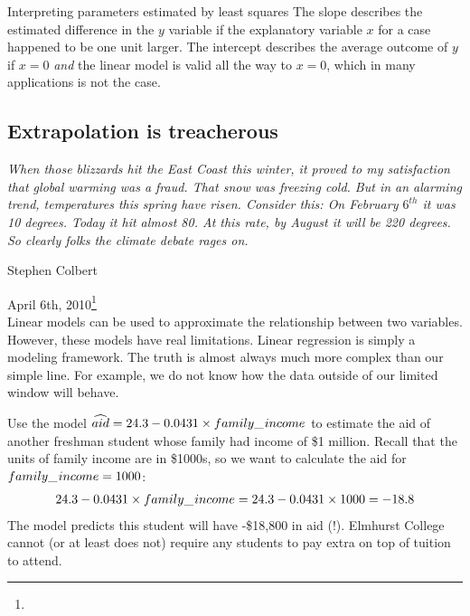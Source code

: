 \begin{onebox}{Interpreting parameters estimated by least squares}
The slope describes the estimated difference in the $y$ variable if the explanatory variable $x$ for a case happened to be one unit larger. The intercept describes the average outcome of $y$ if $x=0$ \emph{and} the linear model is valid all the way to $x=0$, which in many applications is not the case.
\end{onebox}


\subsection{Extrapolation is treacherous}


{\em\small When those blizzards hit the East Coast this winter, it proved to my satisfaction that global warming was a fraud. That snow was freezing cold. But in an alarming trend, temperatures this spring have risen. Consider this: On February $6^{th}$ it was 10 degrees. Today it hit almost 80. At this rate, by August it will be 220 degrees. So clearly folks the climate debate rages on.\vspace{0.5mm}}

\noindent\hspace{\textwidth}\hspace{-40mm}Stephen Colbert

\noindent\hspace{\textwidth}\hspace{-40mm}April 6th, 2010\footnote{} \\

Linear models can be used to approximate the relationship between two variables. However, these models have real limitations. Linear regression is simply a modeling framework. The truth is almost always much more complex than our simple line. For example, we do not know how the data outside of our limited window will behave.

\begin{examplewrap}
\begin{nexample}{Use the model $\widehat{aid} = 24.3 - 0.0431\times family\_\hspace{0.3mm}income$ to estimate the aid of another freshman student whose family had income of \$1 million.}
Recall that the units of family income are in \$1000s, so we want to calculate the aid for $family\_\hspace{0.3mm}income = 1000$:
\begin{align*}
24.3 - 0.0431\times family\_\hspace{0.3mm}income  = 24.3 - 0.0431\times 1000 = -18.8
\end{align*}
The model predicts this student will have -\$18,800 in aid (!). Elmhurst College cannot (or at least does not) require any students to pay extra on top of tuition to attend.
\end{nexample}
\end{examplewrap}


